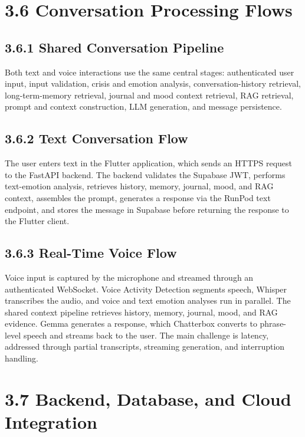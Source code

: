 \documentclass[
  letterpaper,
  12pt,
  a4paper,
  openany]{report}
\begin{document}
\section{3.6 Conversation Processing
Flows}\label{conversation-processing-flows}

\subsection{3.6.1 Shared Conversation
Pipeline}\label{shared-conversation-pipeline}

Both text and voice interactions use the same central stages:
authenticated user input, input validation, crisis and emotion analysis,
conversation-history retrieval, long-term-memory retrieval, journal and
mood context retrieval, RAG retrieval, prompt and context construction,
LLM generation, and message persistence.

\subsection{3.6.2 Text Conversation Flow}\label{text-conversation-flow}

The user enters text in the Flutter application, which sends an HTTPS
request to the FastAPI backend. The backend validates the Supabase JWT,
performs text-emotion analysis, retrieves history, memory, journal,
mood, and RAG context, assembles the prompt, generates a response via
the RunPod text endpoint, and stores the message in Supabase before
returning the response to the Flutter client.

\subsection{3.6.3 Real-Time Voice Flow}\label{real-time-voice-flow}

Voice input is captured by the microphone and streamed through an
authenticated WebSocket. Voice Activity Detection segments speech,
Whisper transcribes the audio, and voice and text emotion analyses run
in parallel. The shared context pipeline retrieves history, memory,
journal, mood, and RAG evidence. Gemma generates a response, which
Chatterbox converts to phrase-level speech and streams back to the user.
The main challenge is latency, addressed through partial transcripts,
streaming generation, and interruption handling.

\section{3.7 Backend, Database, and Cloud
Integration}\label{backend-database-and-cloud-integration}
\end{document}
